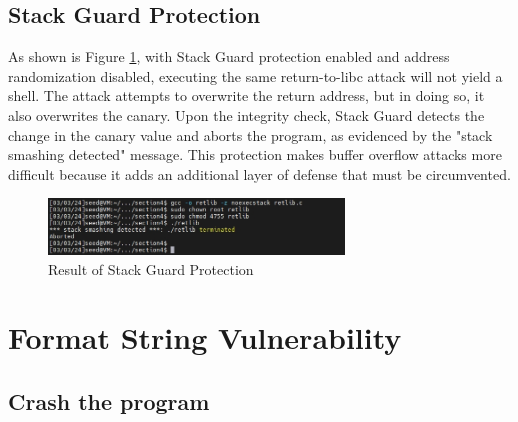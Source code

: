\documentclass[a4paper,11pt]{article}
\begin{document}
\subsection{Stack Guard Protection}
As shown is Figure \ref{fig:task21}, with Stack Guard protection enabled and address randomization disabled, executing the same return-to-libc attack will not yield a shell. The attack attempts to overwrite the return address, but in doing so, it also overwrites the canary. Upon the integrity check, Stack Guard detects the change in the canary value and aborts the program, as evidenced by the "stack smashing detected" message. This protection makes buffer overflow attacks more difficult because it adds an additional layer of defense that must be circumvented.
\begin{figure}[h]
    \centering
       \includegraphics[width=0.7\textwidth]{figures/task21/task21.png}
    \caption{Result of Stack Guard Protection}\label{fig:task21}
\end{figure}

\section{Format String Vulnerability}
\subsection{Crash the program}

%
\end{document}
